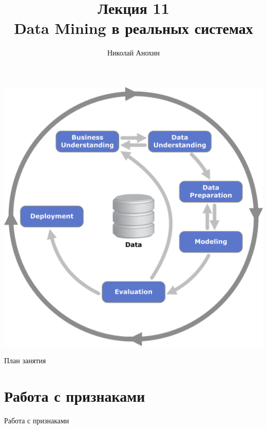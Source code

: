 \documentclass[10pt]{beamer}
\author{Николай Анохин}
\title{\newline \newline \newline Лекция 11 \\ Data Mining в реальных системах}
\let\otp\titlepage
\renewcommand{\titlepage}{\otp\addtocounter{framenumber}{-1}}
\begin{document}
\begin{frame}[plain]
\titlepage
\end{frame}

\begin{frame}{}

\begin{center}
\includegraphics[scale=0.4]{images/crisp.png}
\end{center}

\end{frame}

\begin{frame}{План занятия}
\tableofcontents
\end{frame}


\section{Работа с признаками}


\begin{frame}{}

\begin{center}
\Large Работа с признаками
\end{center}

\end{frame}
\end{document}
